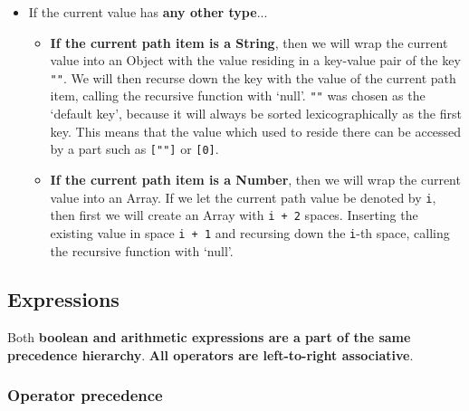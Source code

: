 \documentclass[12pt, letterpaper]{article}
\begin{document}
\begin{center}
\begin{itemize}
\begin{itemize}
\begin{itemize}
\begin{itemize}
                \end{itemize}
            \end{itemize}
            \item If the current value has \textbf{any other type}...
            \begin{itemize}
                \item \textbf{If the current path item is a String}, then we will wrap the current value into an Object with the value residing in a key-value pair of the key \verb|""|. We will then recurse down the key with the value of the current path item, calling the recursive function with `null'. \verb|""| was chosen as the `default key', because it will always be sorted lexicographically as the first key. This means that the value which used to reside there can be accessed by a part such as \verb|[""]| or \verb|[0]|.
                \item \textbf{If the current path item is a Number}, then we will wrap the current value into an Array. If we let the current path value be denoted by \verb|i|, then first we will create an Array with \verb|i + 2| spaces. Inserting the existing value in space \verb|i + 1| and recursing down the \verb|i|-th space, calling the recursive function with `null'.
            \end{itemize}
        \end{itemize}
    \end{itemize}
\end{center}

\subsection{Expressions}
\label{sec:expressions}

Both \textbf{boolean and arithmetic expressions are a part of the same precedence hierarchy}. \textbf{All operators are left-to-right associative}.

\subsubsection{Operator precedence}
\end{document}
